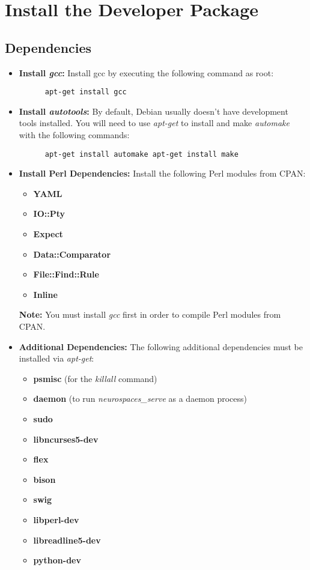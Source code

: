 \documentclass[12pt]{article}
\begin{document}
\section*{Install the Developer Package}

\subsection*{Dependencies}

\begin{itemize}
   \item[]{\bf Install {\it gcc}:} Install gcc by executing the following command as root:
   \begin{verbatim}
      apt-get install gcc
   \end{verbatim}
   
   \item[]{\bf Install {\it autotools}:} By default, Debian usually doesn't have development tools installed. You will need to use {\it apt-get} to install and make {\it automake} with the following commands:
   \begin{verbatim}
      apt-get install automake apt-get install make
   \end{verbatim}
   
   \item[]{\bf Install Perl Dependencies:} Install the following Perl modules from CPAN:
     \begin{itemize}
        \item[]{\bf YAML}
        \item[]{\bf IO::Pty}
        \item[]{\bf Expect}
        \item[]{\bf Data::Comparator}
        \item[]{\bf File::Find::Rule}
        \item[]{\bf Inline}
     \end{itemize}
     {\bf Note:} You must install {\it gcc} first in order to compile Perl modules from CPAN.     

   \item[]{\bf Additional Dependencies:} The following additional dependencies must be installed via {\it apt-get}:
     \begin{itemize}
        \item[]{\bf psmisc} (for the {\it killall} command)
        \item[]{\bf daemon} (to run {\it neurospaces\_serve} as a daemon process)
        \item[]{\bf sudo}
        \item[]{\bf libncurses5-dev}
        \item[]{\bf flex}
        \item[]{\bf bison}
        \item[]{\bf swig}
        \item[]{\bf libperl-dev}
        \item[]{\bf libreadline5-dev}
        \item[]{\bf python-dev}
     \end{itemize}
\end{itemize}
\end{document}
